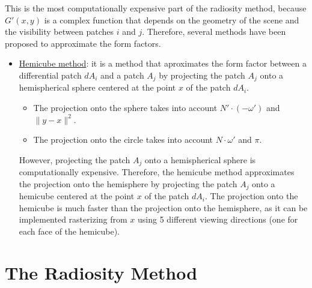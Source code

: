 This is the most computationally expensive part of the radiosity method, because $G'(x, y)$ is a complex function that depends on the geometry of the scene and the visibility between patches $i$ and $j$. Therefore, several methods have been proposed to approximate the form factors.
\begin{itemize}
    \item \ul{Hemicube method}: it is a method that aproximates the form factor between a differential patch $dA_i$ and a patch $A_j$ by projecting the patch $A_j$ onto a hemispherical sphere centered at the point $x$ of the patch $dA_i$.
    \begin{itemize}
        \item The projection onto the sphere takes into account $N' \cdot (-\omega')$ and $\|y-x\|^2$.
        \item The projection onto the circle takes into account $N \cdot \omega'$ and $\pi$.
    \end{itemize}

    However, projecting the patch $A_j$ onto a hemispherical sphere is computationally expensive. Therefore, the hemicube method approximates the projection onto the hemisphere by projecting the patch $A_j$ onto a hemicube centered at the point $x$ of the patch $dA_i$. The projection onto the hemicube is much faster than the projection onto the hemisphere, as it can be implemented rasterizing from $x$ using 5 different viewing directions (one for each face of the hemicube).
\end{itemize}

\section{The Radiosity Method}

